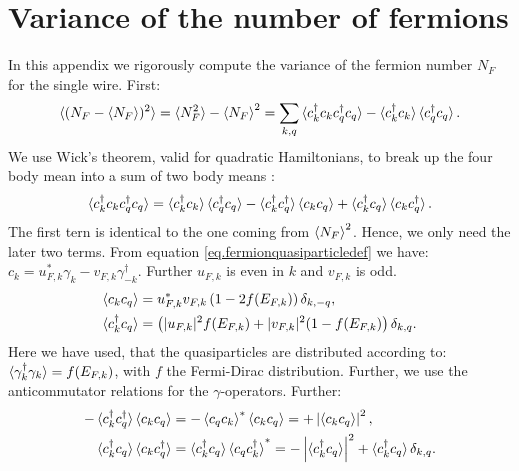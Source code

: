 
\chapter{Variance of the number of fermions} %

\label{Appendix.Fluctuationfermionnumber} %
\chead{}
In this appendix we rigorously compute the variance of the fermion number $N_F$ for the single wire. First:
\begin{equation}
\braket{(N_F-{\braket{N_F}})^2} = \braket{N_F^2} - \braket{N_F}^2 = \sum_{k,q} \braket{c^\dagger_kc_kc^\dagger_qc_q} - \braket{c^\dagger_kc_k}\braket{c^\dagger_qc_q}. \nonumber
\end{equation} 
We use Wick's theorem, valid for quadratic Hamiltonians, to break up the four body mean into a sum of two body means \cite{BruusFlensberg}:
\begin{equation}
\braket{c^\dagger_kc_kc^\dagger_qc_q} = \braket{c^\dagger_kc_k}\braket{c^\dagger_qc_q} - \braket{c^\dagger_kc^\dagger_q}\braket{c_kc_q} + \braket{c^\dagger_kc_q}\braket{c_kc^\dagger_q}. \nonumber
\end{equation}
The first tern is identical to the one coming from $\braket{N_F}^2$. Hence, we only need the later two terms. From equation \eqref{eq.fermionquasiparticledef} we have: $c_k = u^{*}_{F,k}\gamma_k - v_{F,k}\gamma^\dagger_{-k}$. Further $u_{F,k}$ is even in $k$ and $v_{F,k}$ is odd. 
\begin{align}
\braket{c_kc_q} &= u^{*}_{F,k}v_{F,k}\left(1 - 2f(E_{F,k})\right)\delta_{k,-q}, \nonumber \\
\braket{c^\dagger_kc_q} &= \left(|u_{F,k}|^2f(E_{F,k}) + |v_{F,k}|^2(1-f(E_{F,k})\right)\delta_{k,q}. \nonumber
\end{align}
Here we have used, that the quasiparticles are distributed according to: $\braket{\gamma^\dagger_k\gamma_k} = f(E_{F,k})$, with $f$ the Fermi-Dirac distribution. Further, we use the anticommutator relations for the $\gamma$-operators. Further:
\begin{align}
-\braket{c^\dagger_kc^\dagger_q}\braket{c_kc_q} &= -\braket{c_qc_k}^*\braket{c_kc_q} = +\left|\braket{c_kc_q}\right|^2, \nonumber \\
\braket{c^\dagger_kc_q}\braket{c_kc^\dagger_q} &= \braket{c^\dagger_kc_q}\braket{c_qc^\dagger_k}^* = -\left|\braket{c^\dagger_kc_q}\right|^2 + \braket{c^\dagger_k c_q}\delta_{k,q}. \nonumber
\end{align}
